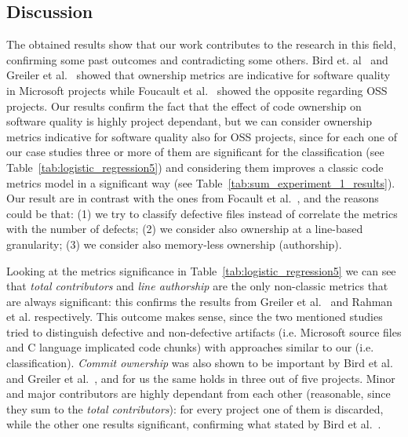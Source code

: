 \subsection{Discussion}



%
The obtained results show that our work contributes to the research in this field, confirming some past outcomes and contradicting some others.
Bird et. al~\cite{bird:original} and Greiler et al.~\cite{Greiler:replication} showed that ownership metrics are indicative for software quality in Microsoft projects while Foucault et al.~\cite{Foucault:oss} showed the opposite regarding OSS projects. Our results confirm the fact that the effect of code ownership on software quality is highly project dependant, but we can consider ownership metrics indicative for software quality also for OSS projects, since for each one of our case studies three or more of them are significant for the classification (see Table~\ref{tab:logistic_regression5}) and considering them improves a classic code metrics model in a significant way (see Table~\ref{tab:sum_experiment_1_results}). Our result are in contrast with the ones from Focault et al.~\cite{Foucault:oss}, and the reasons could be that: (1) we try to classify defective files instead of correlate the metrics with the number of defects; (2) we consider also ownership at a line-based granularity; (3) we consider also memory-less ownership (authorship).

Looking at the metrics significance in Table~\ref{tab:logistic_regression5} we can see that \textit{total contributors} and \textit{line authorship} are the only non-classic metrics that are always significant: this confirms the results from Greiler et al.~\cite{Greiler:replication} and Rahman et al. respectively. This outcome makes sense, since the two mentioned studies tried to distinguish defective and non-defective artifacts (i.e. Microsoft source files and C language implicated code chunks) with approaches similar to our (i.e. classification). \textit{Commit ownership} was also shown to be important by Bird et al.~\cite{bird:original} and Greiler et al.~\cite{Greiler:replication}, and for us the same holds in three out of five projects. Minor and major contributors are highly dependant from each other (reasonable, since they sum to the \textit{total contributors}): for every project one of them is discarded, while the other one results significant, confirming what stated by Bird et al.~\cite{bird:original}.
